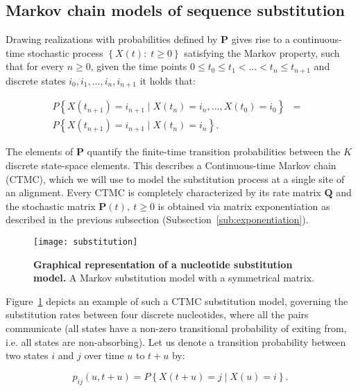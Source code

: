 \subsection{Markov chain models of sequence substitution\label{sub:subst_models}}

Drawing realizations with probabilities defined by $\mathbf{P}$  gives rise to a continuous-time stochastic process $\left\{ X(t):\; t\geq0\right\}$ satisfying the Markov property, such that for every $n\geq 0$, given the time points $0\leq t_{0}\leq t_{1}<\ldots<t_{n}\leq t_{n+1}$ and discrete states $i_{0},i_{1}, \ldots, i_{n},i_{n+1}$ it holds that: 

\begin{eqnarray}
P\left\{ X(t_{n+1})=i_{n+1}\mid X(t_{n})=i_{n},\ldots, X(t_{0})=i_{0}\right\} & = & \\ \nonumber
P\left\{ X(t_{n+1})=i_{n+1}\mid X(t_{n})=i_{n}\right\} .
\label{eq:markov}
\end{eqnarray}

The elements of $\mathbf{P}$ quantify the finite-time transition probabilities between the $K$ discrete state-space elements.
This describes a Continuous-time Markov chain (CTMC), which  we will use to model the substitution process at a single site of an alignment.
Every CTMC is completely characterized by its rate matrix $\mathbf{Q}$ and the stochastic matrix $\mathbf{P}(t),\ t\geq0$ is obtained via matrix exponentiation as described in the previous subsection (Subsection~\ref{sub:exponentiation}).

\begin{figure}[H]
\centering
\texttt{[image: substitution]} 
\caption{
{ \footnotesize 
{\bf  Graphical representation of  a nucleotide substitution model.} A Markov substitution model with a symmetrical matrix.
} %
}
\label{fig:substitution}
\end{figure}

Figure~\ref{fig:substitution} depicts an example of such a CTMC substitution model, governing the substitution rates between four discrete nucleotides, where all the pairs communicate (all states have a non-zero transitional probability of exiting from, i.e. all states are non-absorbing).
Let us denote a transition probability between two states $i$ and $j$ over time $u$ to $t+u$ by:

\begin{equation}
p_{ij}\left(u,t+u\right)=P\left\{ X(t+u)=j\mid X(u)=i\right\} .
\end{equation}

